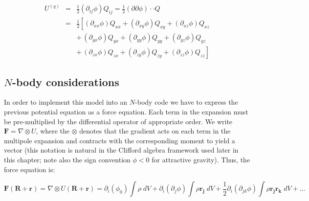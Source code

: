 \begin{eqnarray}
U^{(q)} &=& \frac{1}{2}(\partial_{ij} \phi) Q_{ij} = \frac{1}{2}(\partial\partial \phi)\cdot\cdot Q \\
&=& \frac{1}{2}\left[ (\partial_{xx} \phi) Q_{xx} + (\partial_{xy} \phi) Q_{xy} + (\partial_{xz} \phi) Q_{xz} \right. \nonumber \\
&& \left. +\, (\partial_{yx} \phi) Q_{yx} + (\partial_{yy} \phi) Q_{yy} + (\partial_{yz} \phi) Q_{yz} \right. \nonumber \\
&& \left. +\, (\partial_{zx} \phi) Q_{zx} + (\partial_{zy} \phi) Q_{zy} + (\partial_{zz} \phi) Q_{zz} \right]
\end{eqnarray}

\subsection{$N$-body considerations}
In order to implement this model into an $N$-body code we have to express the previous potential equation as a force equation. Each term in the expansion must be pre-multiplied by the differential operator of appropriate order. We write $\mathbf{F} = \nabla \otimes U$, where the $\otimes$ denotes that the gradient acts on each term in the multipole expansion and contracts with the corresponding moment to yield a vector (this notation is natural in the Clifford algebra framework used later in this chapter; note also the sign convention $\phi < 0$ for attractive gravity). Thus, the force equation is:

\begin{equation}
\mathbf{F} (\mathbf{R} +\mathbf{r}) = \nabla \otimes U (\mathbf{R }+ \mathbf{r}) = \partial_i(\phi_0) \int \rho\;dV + \partial_i(\partial_j \phi) \int \rho \mathbf{r_j}\;dV + \frac{1}{2}\partial_i(\partial_{jk} \phi) \int \rho \mathbf{r_j} \mathbf{r_k}\;dV + \ldots
\end{equation}


